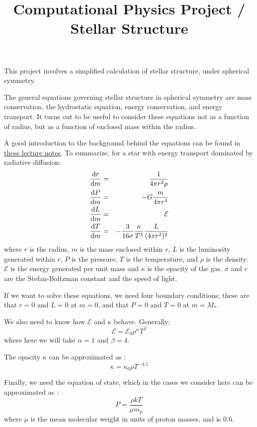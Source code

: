 \documentclass[11pt, preprint]{aastex}
\begin{document}
\title{\bf Computational Physics Project / Stellar Structure}

This project involves a simplified calculation of stellar structure,
under spherical symmetry.

The general equations governing stellar structure in spherical
symmetry are mass conservation, the hydrostatic equation, energy
conservation, and energy transport. It turns out to be useful to 
consider these equations not as a function of radius, but as a
function of enclosed mass within the radius.

A good introduction to the background behind the equations can be
found in
\href{http://www.ast.cam.ac.uk/~pettini/STARS/Lecture09.pdf}{\color{blue}
  these lecture notes}. To summarize, for a star with energy transport
dominated by radiative diffusion:
\begin{eqnarray}
\frac{{\rm d}r}{{\rm d}m} &=& \frac{1}{4\pi r^2 \rho} \cr
\frac{{\rm d}P}{{\rm d}m} &=& -G \frac{m}{4\pi r^4} \cr
\frac{{\rm d}L}{{\rm d}m} &=& \mathcal{E} \cr
\frac{{\rm d}T}{{\rm d}m} &=& - \frac{3}{16 \sigma } \frac{\kappa}{T^3}
\frac{L}{(4\pi r^2)^2}
\end{eqnarray}
where $r$ is the radius, $m$ is the mass enclosed within $r$, $L$ is
the luminosity generated within $r$, $P$ is the pressure, $T$ is the
temperature, and $\rho$ is the density. $\mathcal{E}$ is the energy
generated per unit mass and $\kappa$ is the opacity of the
gas. $\sigma$ and $c$ are the Stefan-Boltzman constant and the speed
of light.

If we want to solve these equations, we need four boundary conditions;
these are that $r=0$ and $L=0$ at $m=0$, and that $P=0$ and $T=0$ at
$m=M_\ast$.

We also need to know how $\mathcal{E}$ and $\kappa$ behave. Generally:
\begin{equation}
\mathcal{E} = \mathcal{E}_0 \rho^\alpha  T^\beta
\end{equation}
where here we will take $\alpha=1$ and $\beta = 4$. 

The opacity $\kappa$ can be approximated as :
\begin{equation}
\kappa = \kappa_0 \rho T^{-3.5}
\end{equation}

Finally, we need the equation of state, which in the cases we consider
here can be approximated as :
\begin{equation}
P = \frac{\rho kT}{\mu m_p}
\end{equation}
where $\mu$ is the mean molecular weight in units of proton masses,
and is 0.6.
\end{document}
